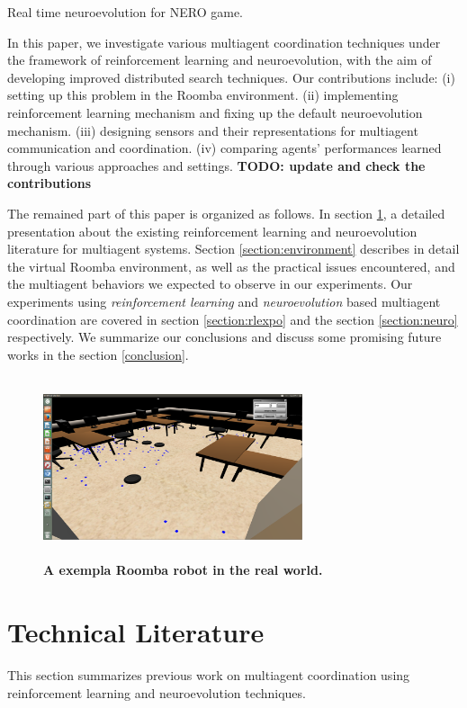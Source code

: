 \documentclass[conference]{IEEEtran}
\begin{document}
\cite{stanley2005real} Real time neuroevolution for NERO game. 

In this paper, we
investigate various multiagent coordination techniques under the framework of
reinforcement learning and neuroevolution, with the aim of developing improved distributed search techniques. 
Our contributions include: 
(i) setting up this problem in the Roomba environment. 
(ii) implementing reinforcement learning mechanism and fixing up the default
neuroevolution mechanism. 
(iii) designing sensors and their representations for multiagent
communication and coordination. 
(iv) comparing agents' performances learned through various approaches and
settings.
\textbf{TODO: update and check the contributions}

The remained part of this paper is organized as follows. 
In section \ref{section:literature}, a detailed presentation about the
existing reinforcement learning and neuroevolution literature
for multiagent systems.  
Section \ref{section:environment} describes in detail the virtual Roomba
environment, as well as the practical issues encountered, and the multiagent
behaviors we expected to observe in our experiments.  
Our experiments using 
\textit{reinforcement learning} and \textit{neuroevolution} based
multiagent coordination are covered in section \ref{section:rlexpo}
and the section \ref{section:neuro} respectively.  
We summarize our conclusions and discuss some promising future works in the
section \ref{conclusion}. 


\begin{figure}[!t]
\centering
\includegraphics[width=3in,height=2.1in]{./figures/roombas/roomba3.png}
\caption{\textbf{A exempla Roomba robot in the real world.}}
\label{roomba:world}
\end{figure}

\section{Technical Literature} \label{section:literature}
This section summarizes previous work on multiagent
coordination using reinforcement learning and
neuroevolution techniques.
\end{document}
